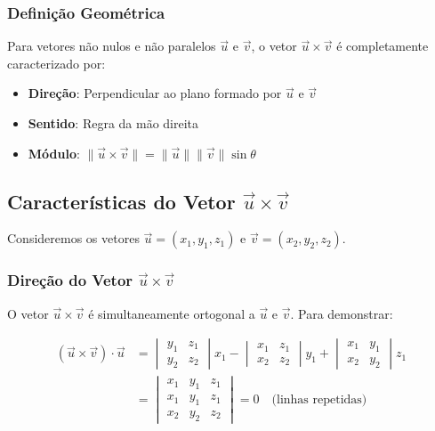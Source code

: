\subsubsection*{Definição Geométrica}

Para vetores não nulos e não paralelos $\vec{u}$ e $\vec{v}$, o vetor $\vec{u}
\times \vec{v}$ é completamente caracterizado por:

\begin{itemize}
  \item \textbf{Direção}: Perpendicular ao plano formado por $\vec{u}$ e $\vec{v}$
  \item \textbf{Sentido}: Regra da mão direita
  \item \textbf{Módulo}: $\|\vec{u} \times \vec{v}\| = \|\vec{u}\|\|\vec{v}\|\sin\theta$
\end{itemize}

\subsection{Características do Vetor $\vec{u} \times \vec{v}$}

Consideremos os vetores $\vec{u} = (x_1, y_1, z_1)$ e $\vec{v} = (x_2, y_2, z_2)$.

\subsubsection*{Direção do Vetor $\vec{u} \times \vec{v}$}
O vetor $\vec{u} \times \vec{v}$ é simultaneamente ortogonal a $\vec{u}$ e $\vec{v}$. Para demonstrar:

\begin{align*}
(\vec{u} \times \vec{v}) \cdot \vec{u} &= 
\begin{vmatrix}
y_1 & z_1 \\
y_2 & z_2 
\end{vmatrix}x_1 - 
\begin{vmatrix}
x_1 & z_1 \\
x_2 & z_2 
\end{vmatrix}y_1 + 
\begin{vmatrix}
x_1 & y_1 \\
x_2 & y_2 
\end{vmatrix}z_1 \\
&= 
\begin{vmatrix}
x_1 & y_1 & z_1 \\
x_1 & y_1 & z_1 \\
x_2 & y_2 & z_2 
\end{vmatrix} = 0 \quad \text{(linhas repetidas)}
\end{align*}


